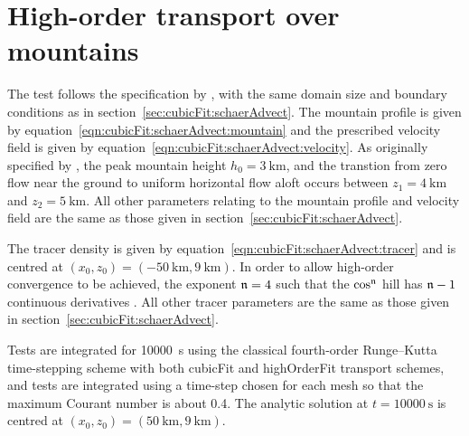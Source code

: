 \section{High-order transport over mountains}
\label{sec:highOrderFit:schaerAdvectSmooth}


The test follows the specification by \citet{schaer2002}, with the same domain size and boundary conditions as in section~\ref{sec:cubicFit:schaerAdvect}.
The mountain profile is given by equation~\eqref{eqn:cubicFit:schaerAdvect:mountain} and the prescribed velocity field is given by equation~\eqref{eqn:cubicFit:schaerAdvect:velocity}.
As originally specified by \citet{schaer2002}, the peak mountain height $h_0 = \SI{3}{\kilo\meter}$, and the transtion from zero flow near the ground to uniform horizontal flow aloft occurs between $z_1 = \SI{4}{\kilo\meter}$ and $z_2 = \SI{5}{\kilo\meter}$.
All other parameters relating to the mountain profile and velocity field are the same as those given in section~\ref{sec:cubicFit:schaerAdvect}.

The tracer density is given by equation~\eqref{eqn:cubicFit:schaerAdvect:tracer} and is centred at $(x_0, z_0) = (\SI{-50}{\kilo\meter}, \SI{9}{\kilo\meter})$.  In order to allow high-order convergence to be achieved, the exponent $\mathfrak{n} = 4$ such that the $\cos^{\mathfrak{n}}$ hill has $\mathfrak{n} - 1$ continuous derivatives \citep{holdaway2008}.
All other tracer parameters are the same as those given in section~\ref{sec:cubicFit:schaerAdvect}.

Tests are integrated for \SI{10000}{\second} using the classical fourth-order Runge–Kutta time-stepping scheme \citep[p. 53]{durran2013} with both cubicFit and highOrderFit transport schemes, and tests are integrated using a time-step chosen for each mesh so that the maximum Courant number is about \num{0.4}.  
The analytic solution at $t = \SI{10000}{\second}$ is centred at $(x_0, z_0) = (\SI{50}{\kilo\meter}, \SI{9}{\kilo\meter})$.



